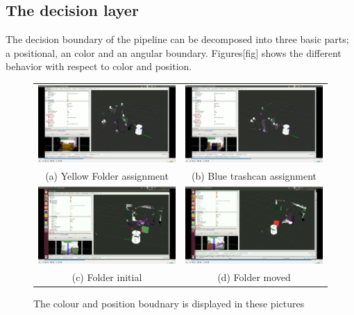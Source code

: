 \documentclass[twoside,hidelinks]{article}
\begin{document}
\subsection{The decision layer}

The decision boundary of the pipeline can be decomposed into three basic parts; a positional, an color and an angular boundary. Figures[fig] shows the different behavior with respect to color and position.

\begin{figure}[h!]

\begin{tabular}{cc}
  \includegraphics[width=.5\textwidth]{colorBound} &   \includegraphics[width=.5\textwidth]{colorBound2} \\
(a) Yellow Folder assignment  & (b) Blue trashcan assignment \\[6pt]
	\includegraphics[width=.5\textwidth]{posBound} &   \includegraphics[width=.5\textwidth]{posBound2} \\
(c) Folder initial  & (d) Folder moved \\[6pt]
\end{tabular}
\caption{The colour and position boudnary is displayed in these pictures}
  \label{pip:bounds}
\end{figure}
\end{document}
